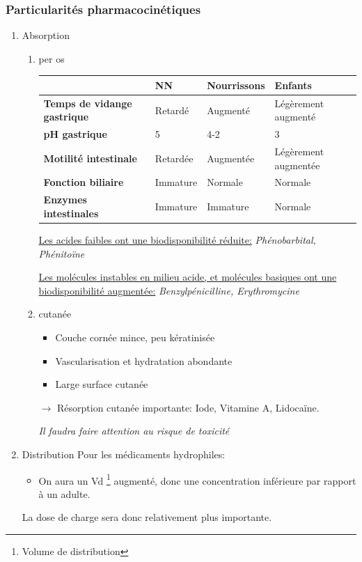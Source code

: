\documentclass[11pt]{article}
\begin{document}
\subsubsection{Particularités pharmacocinétiques}
\label{sec:org5afcd3f}
\begin{enumerate}
\item Absorption
\label{sec:orgddcc710}
\begin{enumerate}
\item per os
\label{sec:org4113be8}
\begin{center}
\begin{tabular}{llll}
 & NN & Nourrissons & Enfants\\
\hline
\textbf{Temps de vidange gastrique} & Retardé & Augmenté & Légèrement augmenté\\
\textbf{pH gastrique} & 5 & 4-2 & 3\\
\textbf{Motilité intestinale} & Retardée & Augmentée & Légèrement augmentée\\
\textbf{Fonction biliaire} & Immature & Normale & Normale\\
\textbf{Enzymes intestinales}\footnotemark & Immature & Immature & Normale\\
\end{tabular}
\end{center}
\uline{Les acides faibles ont une biodisponibilité réduite:} \emph{Phénobarbital, Phénitoïne}

\uline{Les molécules instables en milieu acide, et molécules basiques  ont une biodisponibilité augmentée:} \emph{Benzylpénicilline, Erythromycine}
\item cutanée
\label{sec:orgd02508a}
\begin{itemize}
\item Couche cornée mince, peu kératinisée
\item Vascularisation et hydratation abondante
\item Large surface cutanée
\end{itemize}
\(\to\) Résorption cutanée importante: Iode, Vitamine A, Lidocaïne.

\emph{Il faudra faire attention au risque de toxicité}
\end{enumerate}
\item Distribution
\label{sec:orge5e840e}
Pour les médicaments hydrophiles:
\begin{itemize}
\item On aura un Vd \footnote{Volume de distribution} augmenté, donc une concentration inférieure par rapport à un adulte.
\end{itemize}
La dose de charge sera donc relativement plus importante.


\end{enumerate}
\end{document}
